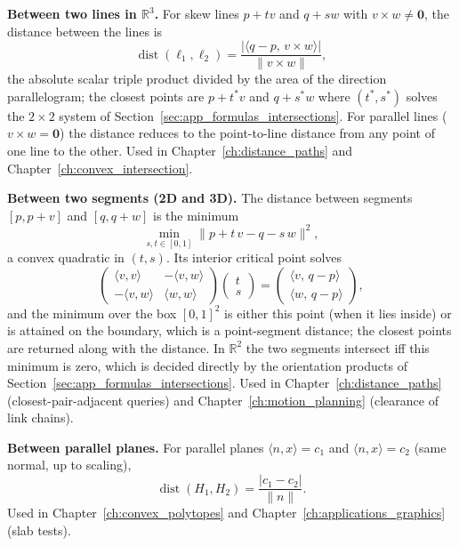 \medskip\noindent\textbf{Between two lines in $\mathbb{R}^3$.}
For skew lines $p + t v$ and $q + s w$ with $v\times w \neq \mathbf{0}$,
the distance between the lines is
\[
  \operatorname{dist}(\ell_1, \ell_2)
  = \frac{\bigl|\langle q - p,\, v\times w\rangle\bigr|}{\|v\times w\|},
\]
the absolute scalar triple product divided by the area of the direction
parallelogram; the closest points are $p + t^* v$ and $q + s^* w$ where
$(t^*, s^*)$ solves the $2\times 2$ system of
Section~\ref{sec:app_formulas_intersections}. For parallel lines
($v\times w = \mathbf{0}$) the distance reduces to the point-to-line
distance from any point of one line to the other. Used in
Chapter~\ref{ch:distance_paths} and Chapter~\ref{ch:convex_intersection}.

\medskip\noindent\textbf{Between two segments (2D and 3D).}
The distance between segments $[p, p+v]$ and $[q, q+w]$ is the minimum
\[
  \min_{s,t \in [0,1]} \bigl\| p + t\,v - q - s\,w \bigr\|^2,
\]
a convex quadratic in $(t, s)$. Its interior critical point solves
\[
  \begin{pmatrix}
    \langle v,v\rangle & -\langle v,w\rangle\\
    -\langle v,w\rangle & \langle w,w\rangle
  \end{pmatrix}
  \begin{pmatrix} t \\ s \end{pmatrix}
  = \begin{pmatrix} \langle v,\, q-p\rangle \\ \langle w,\, q-p\rangle \end{pmatrix},
\]
and the minimum over the box $[0,1]^2$ is either this point (when it lies
inside) or is attained on the boundary, which is a point-segment distance;
the closest points are returned along with the distance. In $\mathbb{R}^2$
the two segments intersect iff this minimum is zero, which is decided
directly by the orientation products of Section~\ref{sec:app_formulas_intersections}.
Used in Chapter~\ref{ch:distance_paths} (closest-pair-adjacent queries)
and Chapter~\ref{ch:motion_planning} (clearance of link chains).

\medskip\noindent\textbf{Between parallel planes.}
For parallel planes $\langle n, x\rangle = c_1$ and
$\langle n, x\rangle = c_2$ (same normal, up to scaling),
\[
  \operatorname{dist}(H_1, H_2) = \frac{|c_1 - c_2|}{\|n\|}.
\]
Used in Chapter~\ref{ch:convex_polytopes} and
Chapter~\ref{ch:applications_graphics} (slab tests).


